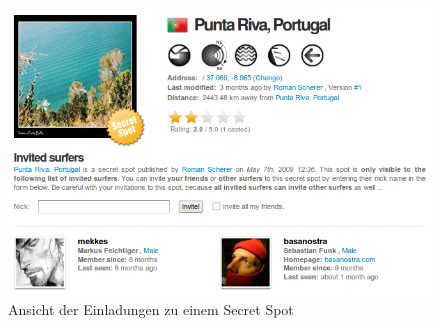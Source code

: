 \begin{figure}[t]
 \includegraphics[width=\textwidth]{bilder/secret-spot}
 \caption{Ansicht der Einladungen zu einem Secret Spot}
 \label{secret-spot}
\end{figure}


